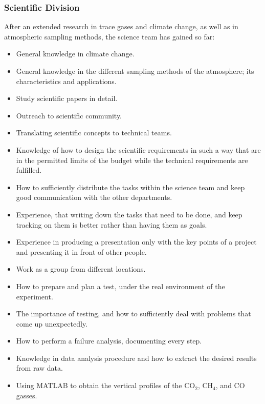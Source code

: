 \subsubsection{Scientific Division}
After an extended research in trace gases and climate change, as well as in atmospheric sampling methods, the science team has gained so far: 
\begin{itemize}
    \item General knowledge in climate change.
    \item General knowledge in the different sampling methods of the atmosphere; its characteristics and applications.
    \item Study scientific papers in detail.
    \item Outreach to scientific community.
    \item Translating scientific concepts to technical teams.
    \item Knowledge of how to design the scientific requirements in such a way that are in the permitted limits of the budget while the technical requirements are fulfilled.   
    \item How to sufficiently distribute the tasks within the science team and keep good communication with the other departments. 
    \item Experience, that writing down the tasks that need to be done, and keep tracking on them is better rather than having them as goals.
    \item Experience in producing a presentation only with the key points of a project and presenting it in front of other people.
    \item Work as a group from different locations.
    \item How to prepare and plan a test, under the real environment of the experiment. 
    \item The importance of testing, and how to sufficiently deal with problems that come up unexpectedly.
    \item How to perform a failure analysis, documenting every step.
    \item Knowledge in data analysis procedure and how to extract the desired results from raw data.
    \item Using MATLAB to obtain the vertical profiles of the CO$_2$, CH$_4$, and CO gasses. 
     
\end{itemize}



